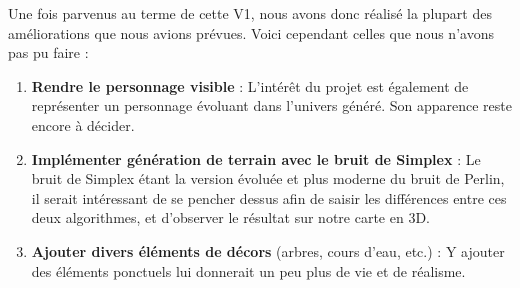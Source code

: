 Une fois parvenus au terme de cette V1, nous avons donc réalisé la plupart des améliorations que nous avions prévues. Voici cependant celles que nous n'avons pas pu faire :

\vspace{0.5cm}
\begin{enumerate}
	\item \textbf{Rendre le personnage visible} : L'intérêt du projet est également de représenter un personnage évoluant dans l'univers généré. Son apparence reste encore à décider.
	\item \textbf{Implémenter génération de terrain avec le bruit de Simplex }: Le bruit de Simplex étant la version évoluée et plus moderne du bruit de Perlin, il serait intéressant de se pencher dessus afin de saisir les différences entre ces deux algorithmes, et d'observer le résultat sur notre carte en 3D. 
	\item \textbf{Ajouter divers éléments de décors }(arbres, cours d'eau, etc.) : Y ajouter des éléments ponctuels lui donnerait un peu plus de vie et de réalisme.
\end{enumerate}






